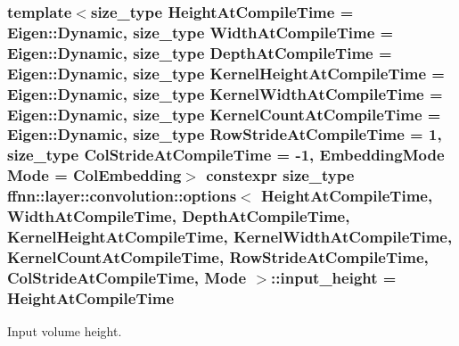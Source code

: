 \hypertarget{structffnn_1_1layer_1_1convolution_1_1options_aabb3c99df1150983902ebf9741a22a1a}{
\subsubsection[{input\-\_\-height}]{\setlength{\rightskip}{0pt plus 5cm}template$<$size\-\_\-type Height\-At\-Compile\-Time = Eigen\-::\-Dynamic, size\-\_\-type Width\-At\-Compile\-Time = Eigen\-::\-Dynamic, size\-\_\-type Depth\-At\-Compile\-Time = Eigen\-::\-Dynamic, size\-\_\-type Kernel\-Height\-At\-Compile\-Time = Eigen\-::\-Dynamic, size\-\_\-type Kernel\-Width\-At\-Compile\-Time = Eigen\-::\-Dynamic, size\-\_\-type Kernel\-Count\-At\-Compile\-Time = Eigen\-::\-Dynamic, size\-\_\-type Row\-Stride\-At\-Compile\-Time = 1, size\-\_\-type Col\-Stride\-At\-Compile\-Time = -\/1, Embedding\-Mode Mode = Col\-Embedding$>$ constexpr {\bf size\-\_\-type} {\bf ffnn\-::layer\-::convolution\-::options}$<$ Height\-At\-Compile\-Time, Width\-At\-Compile\-Time, Depth\-At\-Compile\-Time, Kernel\-Height\-At\-Compile\-Time, Kernel\-Width\-At\-Compile\-Time, Kernel\-Count\-At\-Compile\-Time, Row\-Stride\-At\-Compile\-Time, Col\-Stride\-At\-Compile\-Time, Mode $>$\-::input\-\_\-height = Height\-At\-Compile\-Time\hspace{0.3cm}{\ttfamily [static]}}}\label{structffnn_1_1layer_1_1convolution_1_1options_aabb3c99df1150983902ebf9741a22a1a}


Input volume height. 

